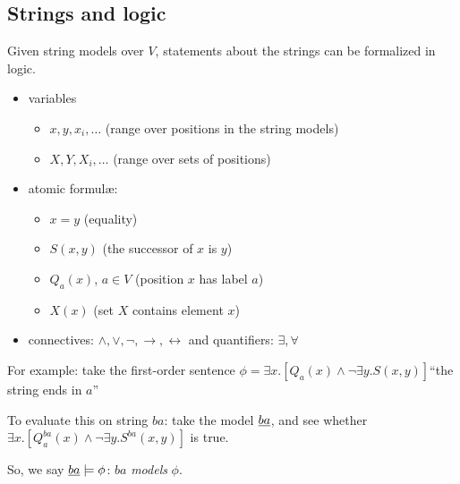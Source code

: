 \documentclass{beamer}
\begin{document}
\subsection{Strings and logic}
\begin{frame}
Given string models over $V$, statements about the strings can be formalized in logic.


\begin{itemize}
\item variables
\begin{itemize}
	\item $x,y,x_i,\dots$		\hfill(range over positions in the string models)
	\item<2> $X,Y,X_i,\dots$	\hfill(range over sets of positions)
\end{itemize}
\item atomic formulæ:
	\begin{itemize}
	\item $x=y$					\hfill(equality)
	\item $S(x,y)$ 				\hfill(the successor of $x$ is $y$)
	\item $Q_a(x)$, $a\in V$	\hfill(position $x$ has label $a$)
	\item<2> $X(x)$ 			\hfill(set $X$ contains element $x$)
	\end{itemize}
\item connectives: $\land,\lor,\lnot,\rightarrow,\leftrightarrow$ and quantifiers: $\exists, \forall$

\end{itemize}


\end{frame}

\begin{frame}

For example: take the first-order sentence $\phi = \exists x. [Q_a(x)\land \lnot \exists y . S(x,y)]$\hfill``the string ends in $a$''
\pause

To evaluate this on string $ba$: take the model $\uline{ba}$, and see whether $\exists x. [Q^{ba}_a(x)\land \lnot \exists y . S^{ba}(x,y)]$ is true.  \pause \checkmark

\pause 
So, we say $\uline{ba}\models\phi$: $ba$ \emph{models} $\phi$.
\end{frame}
\end{document}
